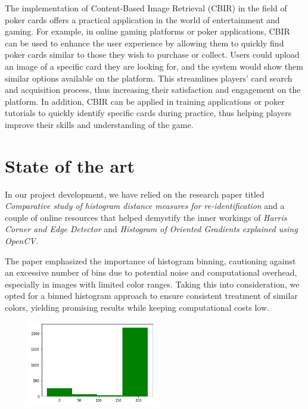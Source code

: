 \documentclass[12pt]{article}
\begin{document}
The implementation of Content-Based Image Retrieval (CBIR) in the field of poker cards offers a practical application in the world of entertainment and gaming. For example, in online gaming platforms or poker applications, CBIR can be used to enhance the user experience by allowing them to quickly find poker cards similar to those they wish to purchase or collect. Users could upload an image of a specific card they are looking for, and the system would show them similar options available on the platform. This streamlines players' card search and acquisition process, thus increasing their satisfaction and engagement on the platform. In addition, CBIR can be applied in training applications or poker tutorials to quickly identify specific cards during practice, thus helping players improve their skills and understanding of the game.

\section{State of the art}

In our project development, we have relied on the research paper titled \textit{Comparative study of histogram distance measures for re-identification}\cite{marin-reyes_comparative_2016} and a couple of online resources that helped demystify the inner workings of \textit{Harris Corner and Edge Detector}\cite{berrios_harris_2024} and \textit{Histogram of Oriented Gradients explained using OpenCV}\cite{noauthor_histogram_2016}.

The paper emphasized the importance of histogram binning, cautioning against an excessive number of bins due to potential noise and computational overhead, especially in images with limited color ranges. Taking this into consideration, we opted for a binned histogram approach to ensure consistent treatment of similar colors, yielding promising results while keeping computational costs low.

\begin{figure}[H]
    \centering
    \includegraphics[width=0.5\textwidth]{imgs/histogram.png}
\end{figure}
\end{document}
